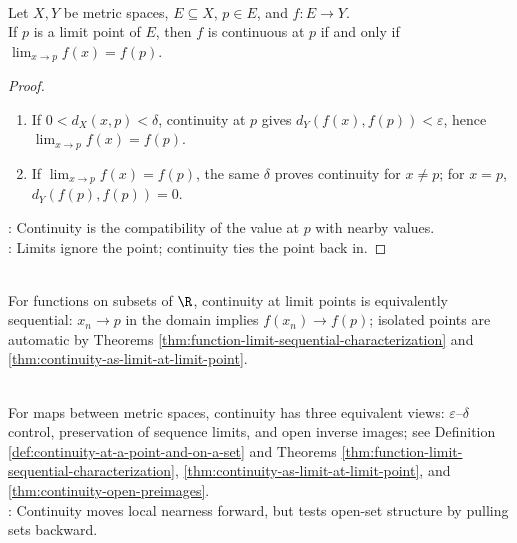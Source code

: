 \begin{theorem} \label{thm:continuity-as-limit-at-limit-point} \\
Let $X,Y$ be metric spaces, $E\subseteq X$, $p\in E$, and $f:E\to Y$.\\
If $p$ is a limit point of $E$, then $f$ is continuous at $p$ if and only if $\lim_{x\to p}f(x)=f(p)$.
\begin{proof}
\begin{enumerate}[label=\roman*.]
\setlength{\itemsep}{0pt}
\item[$(\Rightarrow)$] If $0<d_X(x,p)<\delta$, continuity at $p$ gives $d_Y(f(x),f(p))<\varepsilon$, hence $\lim_{x\to p}f(x)=f(p)$.
\item[$(\Leftarrow)$] If $\lim_{x\to p}f(x)=f(p)$, the same $\delta$ proves continuity for $x\neq p$; for $x=p$, $d_Y(f(p),f(p))=0$.
\end{enumerate}
: Continuity is the compatibility of the value at $p$ with nearby values.\\
: Limits ignore the point; continuity ties the point back in.
\end{proof}
\end{theorem}

\begin{remark} \label{rem:sequential-continuity-real-line} \\
For functions on subsets of $\R$, continuity at limit points is equivalently sequential: $x_n\to p$ in the domain implies $f(x_n)\to f(p)$; isolated points are automatic by Theorems \ref{thm:function-limit-sequential-characterization} and \ref{thm:continuity-as-limit-at-limit-point}.
\end{remark}

\begin{perspective} \label{per:three-views-of-continuity} \\
For maps between metric spaces, continuity has three equivalent views: $\varepsilon$--$\delta$ control, preservation of sequence limits, and open inverse images; see Definition \ref{def:continuity-at-a-point-and-on-a-set} and Theorems \ref{thm:function-limit-sequential-characterization}, \ref{thm:continuity-as-limit-at-limit-point}, and \ref{thm:continuity-open-preimages}.\\
: Continuity moves local nearness forward, but tests open-set structure by pulling sets backward.
\end{perspective}

